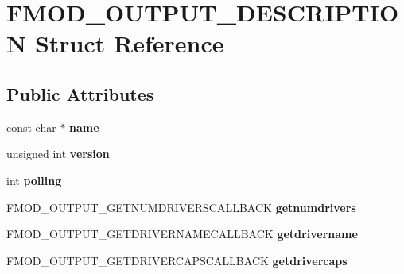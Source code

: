 \hypertarget{struct_f_m_o_d___o_u_t_p_u_t___d_e_s_c_r_i_p_t_i_o_n}{\section{F\-M\-O\-D\-\_\-\-O\-U\-T\-P\-U\-T\-\_\-\-D\-E\-S\-C\-R\-I\-P\-T\-I\-O\-N Struct Reference}
\label{struct_f_m_o_d___o_u_t_p_u_t___d_e_s_c_r_i_p_t_i_o_n}
}
\subsection*{Public Attributes}
\begin{DoxyCompactItemize}
\item 
\hypertarget{struct_f_m_o_d___o_u_t_p_u_t___d_e_s_c_r_i_p_t_i_o_n_ab2d1c75ad80fc949101a31310f6866fe}{const char $\ast$ {\bfseries name}}\label{struct_f_m_o_d___o_u_t_p_u_t___d_e_s_c_r_i_p_t_i_o_n_ab2d1c75ad80fc949101a31310f6866fe}

\item 
\hypertarget{struct_f_m_o_d___o_u_t_p_u_t___d_e_s_c_r_i_p_t_i_o_n_a1ffa1ceb39e6b22a0887819f479cbdd9}{unsigned int {\bfseries version}}\label{struct_f_m_o_d___o_u_t_p_u_t___d_e_s_c_r_i_p_t_i_o_n_a1ffa1ceb39e6b22a0887819f479cbdd9}

\item 
\hypertarget{struct_f_m_o_d___o_u_t_p_u_t___d_e_s_c_r_i_p_t_i_o_n_a523fa9268311d2f39464bc0d8bdacf53}{int {\bfseries polling}}\label{struct_f_m_o_d___o_u_t_p_u_t___d_e_s_c_r_i_p_t_i_o_n_a523fa9268311d2f39464bc0d8bdacf53}

\item 
\hypertarget{struct_f_m_o_d___o_u_t_p_u_t___d_e_s_c_r_i_p_t_i_o_n_ae5ed5731da53559226a6dc0114a67101}{F\-M\-O\-D\-\_\-\-O\-U\-T\-P\-U\-T\-\_\-\-G\-E\-T\-N\-U\-M\-D\-R\-I\-V\-E\-R\-S\-C\-A\-L\-L\-B\-A\-C\-K {\bfseries getnumdrivers}}\label{struct_f_m_o_d___o_u_t_p_u_t___d_e_s_c_r_i_p_t_i_o_n_ae5ed5731da53559226a6dc0114a67101}

\item 
\hypertarget{struct_f_m_o_d___o_u_t_p_u_t___d_e_s_c_r_i_p_t_i_o_n_ade7eeb2121ade877145b71e77c97d8ad}{F\-M\-O\-D\-\_\-\-O\-U\-T\-P\-U\-T\-\_\-\-G\-E\-T\-D\-R\-I\-V\-E\-R\-N\-A\-M\-E\-C\-A\-L\-L\-B\-A\-C\-K {\bfseries getdrivername}}\label{struct_f_m_o_d___o_u_t_p_u_t___d_e_s_c_r_i_p_t_i_o_n_ade7eeb2121ade877145b71e77c97d8ad}

\item 
\hypertarget{struct_f_m_o_d___o_u_t_p_u_t___d_e_s_c_r_i_p_t_i_o_n_a10a61f364d202bc6d4f298ef41b40fb9}{F\-M\-O\-D\-\_\-\-O\-U\-T\-P\-U\-T\-\_\-\-G\-E\-T\-D\-R\-I\-V\-E\-R\-C\-A\-P\-S\-C\-A\-L\-L\-B\-A\-C\-K {\bfseries getdrivercaps}}\label{struct_f_m_o_d___o_u_t_p_u_t___d_e_s_c_r_i_p_t_i_o_n_a10a61f364d202bc6d4f298ef41b40fb9}


\end{DoxyCompactItemize}
